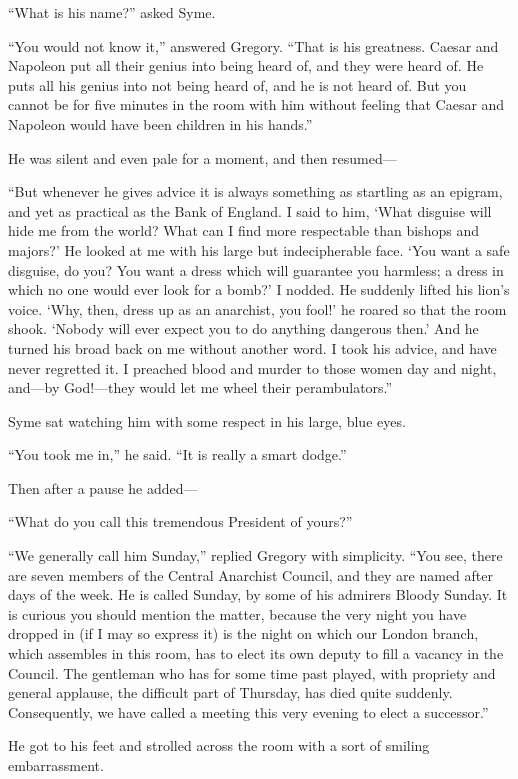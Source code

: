 “What is his name?” asked Syme.

“You would not know it,” answered Gregory. “That is his greatness. Caesar and Napoleon put all their genius into being heard of, and they were heard of. He puts all his genius into not being heard of, and he is not heard of. But you cannot be for five minutes in the room with him without feeling that Caesar and Napoleon would have been children in his hands.”

He was silent and even pale for a moment, and then resumed⁠—

“But whenever he gives advice it is always something as startling as an epigram, and yet as practical as the Bank of England. I said to him, ‘What disguise will hide me from the world? What can I find more respectable than bishops and majors?’ He looked at me with his large but indecipherable face. ‘You want a safe disguise, do you? You want a dress which will guarantee you harmless; a dress in which no one would ever look for a bomb?’ I nodded. He suddenly lifted his lion’s voice. ‘Why, then, dress up as an anarchist, you fool!’ he roared so that the room shook. ‘Nobody will ever expect you to do anything dangerous then.’ And he turned his broad back on me without another word. I took his advice, and have never regretted it. I preached blood and murder to those women day and night, and⁠—by God!⁠—they would let me wheel their perambulators.”

Syme sat watching him with some respect in his large, blue eyes.

“You took me in,” he said. “It is really a smart dodge.”

Then after a pause he added⁠—

“What do you call this tremendous President of yours?”

“We generally call him Sunday,” replied Gregory with simplicity. “You see, there are seven members of the Central Anarchist Council, and they are named after days of the week. He is called Sunday, by some of his admirers Bloody Sunday. It is curious you should mention the matter, because the very night you have dropped in (if I may so express it) is the night on which our London branch, which assembles in this room, has to elect its own deputy to fill a vacancy in the Council. The gentleman who has for some time past played, with propriety and general applause, the difficult part of Thursday, has died quite suddenly. Consequently, we have called a meeting this very evening to elect a successor.”

He got to his feet and strolled across the room with a sort of smiling embarrassment.

